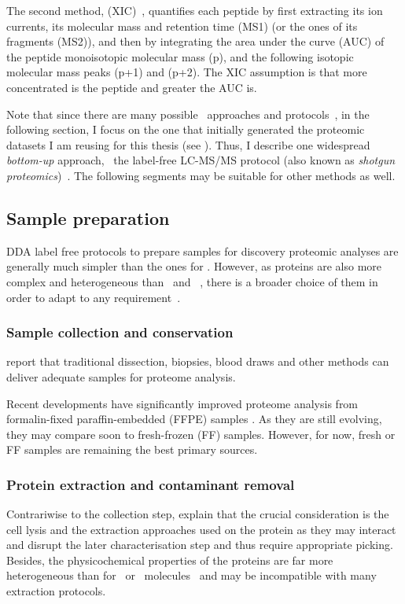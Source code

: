 The second method,  (\gls{XIC})~,
quantifies each peptide by first extracting its ion currents,
its molecular mass and retention time (MS1) (or the ones of its fragments (MS2)),
and then by integrating the area under the curve (\gls{AUC}) of the peptide
monoisotopic molecular mass (p),
and the following isotopic molecular mass peaks (p+1) and (p+2).
The \gls{XIC} assumption is that more concentrated is the peptide and
greater the \gls{AUC} is.\mybr\

Note that since there are many possible \ms\ approaches and protocols~,
in the following section, I focus on the one
that initially generated the proteomic datasets
I am reusing for this thesis (see ).
Thus, I describe one widespread \emph{bottom-up} approach,
\ie\ the label-free \gls{LC-MS/MS} protocol
(also known as \emph{shotgun proteomics})~.
The following segments may be suitable for other methods as well.\mybr\

\subsection{Sample preparation}\label{subsec:ProtSampPrep}
\gls{DDA} label free protocols to prepare samples for discovery proteomic analyses
are generally much simpler than the ones for \Rnaseq.
However, as proteins are also more complex and heterogeneous
than \DNA\ and \RNA~, there is a broader choice of them
in order to adapt to any requirement~.\mybr\

\subsubsection{Sample collection and conservation}
\citet{Feist2015} report that traditional dissection, biopsies, blood draws and
other methods can deliver adequate samples for proteome analysis.\mybr\

Recent developments have significantly improved proteome analysis from
formalin-fixed paraffin-embedded (\gls{FFPE}) samples .
As they are still evolving,
they may compare soon to fresh-frozen (\gls{FF}) samples.
However, for now, fresh or \gls{FF} samples are remaining the best primary sources.\mybr\

\subsubsection{Protein extraction and contaminant removal}
Contrariwise to the collection step, \citet{Feist2015} explain that the crucial
consideration is the cell lysis and the extraction approaches used on
the protein as they may interact and disrupt the later characterisation step and
thus require appropriate picking. Besides, the physicochemical properties of
the proteins are far more heterogeneous than for \DNA\ or \RNA\ molecules~
and may be incompatible with many extraction protocols.\mybr\

